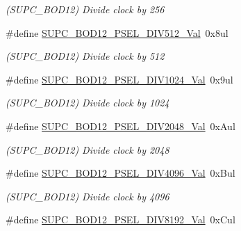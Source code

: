 \begin{DoxyCompactItemize}
\begin{DoxyCompactList}\small\item\em (S\+U\+P\+C\+\_\+\+B\+O\+D12) Divide clock by 256 \end{DoxyCompactList}\item 
\hypertarget{group___s_a_m_l21___s_u_p_c_gadb7725fedb7613a361fae4329158564d}{}\#define \hyperlink{group___s_a_m_l21___s_u_p_c_gadb7725fedb7613a361fae4329158564d}{S\+U\+P\+C\+\_\+\+B\+O\+D12\+\_\+\+P\+S\+E\+L\+\_\+\+D\+I\+V512\+\_\+\+Val}~0x8ul\label{group___s_a_m_l21___s_u_p_c_gadb7725fedb7613a361fae4329158564d}

\begin{DoxyCompactList}\small\item\em (S\+U\+P\+C\+\_\+\+B\+O\+D12) Divide clock by 512 \end{DoxyCompactList}\item 
\hypertarget{group___s_a_m_l21___s_u_p_c_ga7f60f5e2aa0cfd9da64dc363f052109e}{}\#define \hyperlink{group___s_a_m_l21___s_u_p_c_ga7f60f5e2aa0cfd9da64dc363f052109e}{S\+U\+P\+C\+\_\+\+B\+O\+D12\+\_\+\+P\+S\+E\+L\+\_\+\+D\+I\+V1024\+\_\+\+Val}~0x9ul\label{group___s_a_m_l21___s_u_p_c_ga7f60f5e2aa0cfd9da64dc363f052109e}

\begin{DoxyCompactList}\small\item\em (S\+U\+P\+C\+\_\+\+B\+O\+D12) Divide clock by 1024 \end{DoxyCompactList}\item 
\hypertarget{group___s_a_m_l21___s_u_p_c_gacb7e3fd6a7cec31f37fe6e15c4bccad6}{}\#define \hyperlink{group___s_a_m_l21___s_u_p_c_gacb7e3fd6a7cec31f37fe6e15c4bccad6}{S\+U\+P\+C\+\_\+\+B\+O\+D12\+\_\+\+P\+S\+E\+L\+\_\+\+D\+I\+V2048\+\_\+\+Val}~0x\+Aul\label{group___s_a_m_l21___s_u_p_c_gacb7e3fd6a7cec31f37fe6e15c4bccad6}

\begin{DoxyCompactList}\small\item\em (S\+U\+P\+C\+\_\+\+B\+O\+D12) Divide clock by 2048 \end{DoxyCompactList}\item 
\hypertarget{group___s_a_m_l21___s_u_p_c_ga95bb22e3951ddd6c60341e886564498d}{}\#define \hyperlink{group___s_a_m_l21___s_u_p_c_ga95bb22e3951ddd6c60341e886564498d}{S\+U\+P\+C\+\_\+\+B\+O\+D12\+\_\+\+P\+S\+E\+L\+\_\+\+D\+I\+V4096\+\_\+\+Val}~0x\+Bul\label{group___s_a_m_l21___s_u_p_c_ga95bb22e3951ddd6c60341e886564498d}

\begin{DoxyCompactList}\small\item\em (S\+U\+P\+C\+\_\+\+B\+O\+D12) Divide clock by 4096 \end{DoxyCompactList}\item 
\hypertarget{group___s_a_m_l21___s_u_p_c_gae1438499c916fa315ae4f052037816c0}{}\#define \hyperlink{group___s_a_m_l21___s_u_p_c_gae1438499c916fa315ae4f052037816c0}{S\+U\+P\+C\+\_\+\+B\+O\+D12\+\_\+\+P\+S\+E\+L\+\_\+\+D\+I\+V8192\+\_\+\+Val}~0x\+Cul\label{group___s_a_m_l21___s_u_p_c_gae1438499c916fa315ae4f052037816c0}


\end{DoxyCompactItemize}
